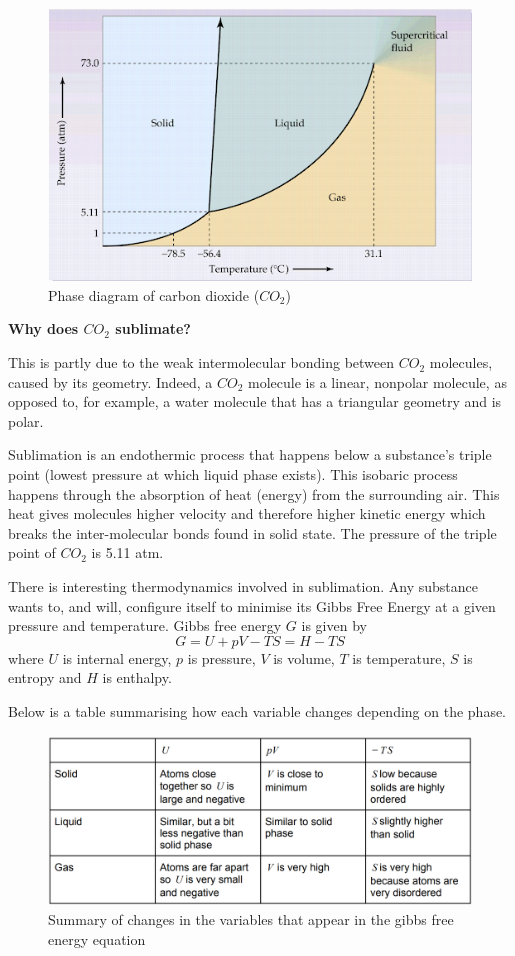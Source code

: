 \documentclass[11pt]{report}
\begin{document}
\begin{figure}[h!]
    \centering
    \includegraphics[width=.8\textwidth,clip]{Phase Diagram of CO2.png}
    \caption{Phase diagram of carbon dioxide ($CO_2$)}
    \label{Phase Diagram}
\end{figure}

\textbf{Why does $CO_2$ sublimate?}

This is partly due to the weak intermolecular bonding between $CO_2$ molecules, caused by its geometry. Indeed, a $CO_2$ molecule is a linear, nonpolar molecule, as opposed to, for example, a water molecule that has a triangular geometry and is polar.

Sublimation is an endothermic process that happens below a substance’s triple point (lowest pressure at which liquid phase exists). This isobaric process happens through the absorption of heat (energy) from the surrounding air. This heat gives molecules higher velocity and therefore higher kinetic energy which breaks the inter-molecular bonds found in solid state. The pressure of the triple point of $CO_2$ is 5.11 atm.

There is interesting thermodynamics involved in sublimation. Any substance wants to, and will, configure itself to minimise its Gibbs Free Energy at a given pressure and temperature. Gibbs free energy $G$ is given by
$$G=U+pV-TS=H-TS$$
where $U$ is internal energy, $p$ is pressure, $V$ is volume, $T$ is temperature, $S$ is entropy and $H$ is enthalpy. 

Below is a table summarising how each variable changes depending on the phase.

\begin{figure}[h!]
    \centering
    \includegraphics[width=1.1\textwidth,clip]{Gibbs Table.png}
    \caption{Summary of changes in the variables that appear in the gibbs free energy equation}
    \label{Gibbs free energy relations}
\end{figure}
\end{document}

